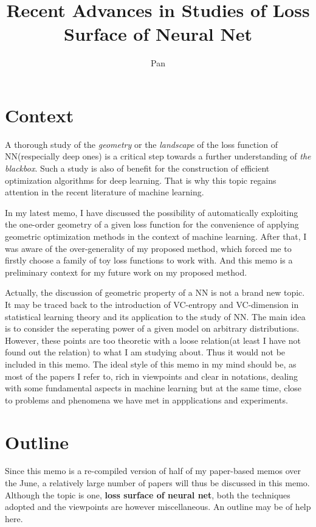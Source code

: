 \documentclass[10pt,a4paper]{article}
\author{Pan}
\title{Recent Advances in Studies of Loss Surface of Neural Net}
\begin{document}
\maketitle
\section{Context}
A thorough study of the \textit{geometry} or the \textit{landscape} of the loss function of NN(respecially deep ones) is a critical step towards a further understanding of \textit{the blackbox}.\cite{open2015} Such a study is also of benefit for the construction of efficient optimization algorithms for deep learning. That is why this topic regains attention in the recent literature of machine learning.

In my latest memo\cite{memo}, I have discussed the possibility of automatically exploiting the one-order geometry of a given loss function for the convenience of applying geometric optimization methods in the context of machine learning. After that, I was aware of the over-generality of my proposed method, which forced me to firstly choose a family of toy loss functions to work with. And this memo is a preliminary context for my future work on my proposed method.   

Actually, the discussion of geometric property of a NN is not a brand new topic. It may be traced back to the introduction of VC-entropy and VC-dimension in statistical learning theory\cite{vapnik2012the} and its application to the study of NN\cite{Anthony2009}. The main idea is to consider the seperating power of a given model on arbitrary distributions. However, these points are too theoretic with a loose relation(at least I have not found out the relation) to what I am studying about. Thus it would not be included in this memo. The ideal style of this memo in my mind should be, as most of the papers I refer to, rich in viewpoints and clear in notations, dealing with some fundamental aspects in machine learning but at the same time, close to problems and phenomena we have met in appplications and experiments.

\section{Outline}
Since this memo is a re-compiled version of half of my paper-based memos over the June, a relatively large number of papers will thus be discussed in this memo. Although the topic is one, \textbf{loss surface of neural net}, both the techniques adopted and the viewpoints are however miscellaneous. An outline may be of help here.
\end{document}
